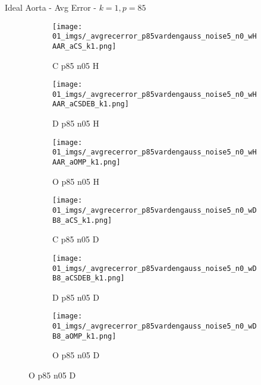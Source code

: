\begin{frame}{Ideal Aorta - Avg Error - $k=1,p=85$}{}
\begin{figure}
\begin{subfigure}{0.13\textwidth}
\texttt{[image: 01\_imgs/\_avgrecerror\_p85vardengauss\_noise5\_n0\_wHAAR\_aCS\_k1.png]}
\caption*{\tiny C p85 n05 H}
\end{subfigure}
\begin{subfigure}{0.13\textwidth}
\texttt{[image: 01\_imgs/\_avgrecerror\_p85vardengauss\_noise5\_n0\_wHAAR\_aCSDEB\_k1.png]}
\caption*{\tiny D p85 n05 H}
\end{subfigure}
\begin{subfigure}{0.13\textwidth}
\texttt{[image: 01\_imgs/\_avgrecerror\_p85vardengauss\_noise5\_n0\_wHAAR\_aOMP\_k1.png]}
\caption*{\tiny O p85 n05 H}
\end{subfigure}
\begin{subfigure}{0.13\textwidth}
\texttt{[image: 01\_imgs/\_avgrecerror\_p85vardengauss\_noise5\_n0\_wDB8\_aCS\_k1.png]}
\caption*{\tiny C p85 n05 D}
\end{subfigure}
\begin{subfigure}{0.13\textwidth}
\texttt{[image: 01\_imgs/\_avgrecerror\_p85vardengauss\_noise5\_n0\_wDB8\_aCSDEB\_k1.png]}
\caption*{\tiny D p85 n05 D}
\end{subfigure}
\begin{subfigure}{0.13\textwidth}
\texttt{[image: 01\_imgs/\_avgrecerror\_p85vardengauss\_noise5\_n0\_wDB8\_aOMP\_k1.png]}
\caption*{\tiny O p85 n05 D}
\end{subfigure}

\vspace{5pt}


\end{figure}
\end{frame}
